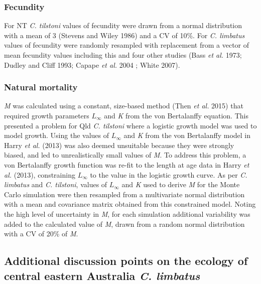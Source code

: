 \documentclass[]{article}
\begin{document}
\hypertarget{fecundity}{%
\subsubsection{Fecundity}\label{fecundity}}

For NT \emph{C. tilstoni} values of fecundity were drawn from a normal
distribution with a mean of 3 (Stevens and Wiley 1986) and a CV of 10\%.
For \emph{C. limbatus} values of fecundity were randomly resampled with
replacement from a vector of mean fecundity values including this and
four other studies (Bass \emph{et al.} 1973; Dudley and Cliff 1993;
Capape \emph{et al.} 2004 ; White 2007).

\hypertarget{natural-mortality}{%
\subsubsection{Natural mortality}\label{natural-mortality}}

\emph{M} was calculated using a constant, size-based method (Then
\emph{et al.} 2015) that required growth parameters \(L_\infty\) and
\emph{K} from the von Bertalanffy equation. This presented a problem for
Qld \emph{C. tilstoni} where a logistic growth model was used to model
growth. Using the values of \(L_\infty\) and \emph{K} from the von
Bertalanffy model in Harry \emph{et al.} (2013) was also deemed
unsuitable because they were strongly biased, and led to unrealistically
small values of \emph{M}. To address this problem, a von Bertalanffy
growth function was re-fit to the length at age data in Harry \emph{et
al.} (2013), constraining \(L_\infty\) to the value in the logistic
growth curve. As per \emph{C. limbatus} and \emph{C. tilstoni}, values
of \(L_\infty\) and \emph{K} used to derive \emph{M} for the Monte Carlo
simulation were then resampled from a multivariate normal distribution
with a mean and covariance matrix obtained from this constrained model.
Noting the high level of uncertainty in \emph{M}, for each simulation
additional variability was added to the calculated value of \emph{M},
drawn from a random normal distribution with a CV of 20\% of \emph{M}.

\newpage

\hypertarget{additional-discussion-points-on-the-ecology-of-central-eastern-australia-c.-limbatus}{%
\subsection{\texorpdfstring{Additional discussion points on the ecology
of central eastern Australia \emph{C.
limbatus}}{Additional discussion points on the ecology of central eastern Australia C. limbatus}}\label{additional-discussion-points-on-the-ecology-of-central-eastern-australia-c.-limbatus}}
\end{document}
